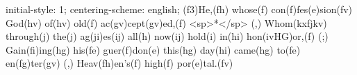 initial-style: 1;
centering-scheme: english;
(f3)He,(fh) whose(f) con(f)fes(e)sion(fv) God(hv) of(hv) old(f) ac(gv)cept(gv)ed,(f) <sp>*</sp> (,)
Whom(kxfjkv) through(j) the(j) ag(ji)es(ij) all(h) now(ij) hold(i) in(hi) hon(ivHG)or,(f) (;)
Gain(fi)ing(hg) his(fe) guer(f)don(e) this(hg) day(hi) came(hg) to(fe) en(fg)ter(gv) (,)
Heav(fh)en's(f) high(f) por(e)tal.(fv)
